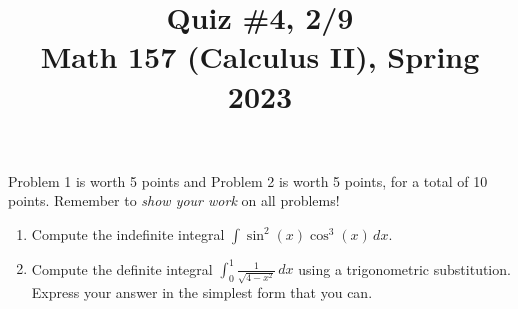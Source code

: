 \documentclass[11pt]{article}
\title{Quiz \#4, 2/9 \\ Math 157 (Calculus II), Spring 2023}
\date{}
\begin{document}
\maketitle

\thispagestyle{empty}

\vspace{-2cm}

Problem 1 is worth 5 points and Problem 2 is worth 5 points, for a total of 10 points. Remember to \emph{show your work} on all problems!

\begin{enumerate}
\item Compute the indefinite integral $\displaystyle \int \sin^2(x) \cos^3(x) \, dx$.

\vspace{8cm}

\item Compute the definite integral $\displaystyle \int_{0}^{1} \frac{1}{\sqrt{4-x^2}} \, dx$ using a trigonometric substitution. \\ Express your answer in the simplest form that you can.

\end{enumerate}
\end{document}
